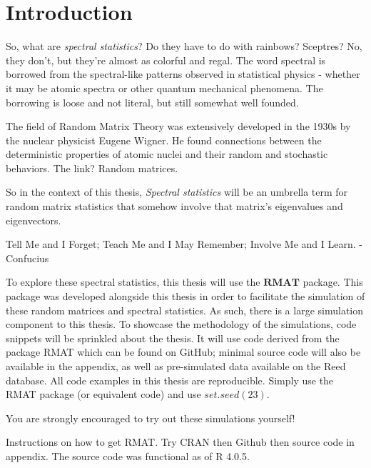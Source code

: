 
  \chapter*{Introduction}


So, what are \textit{spectral statistics}? Do they have to do with rainbows? Sceptres? No, they don’t, but they’re almost as colorful and regal. The word spectral is borrowed from the spectral-like patterns observed in statistical physics - whether it may be atomic spectra or other quantum mechanical phenomena. The borrowing is loose and not literal, but still somewhat well founded.

The field of Random Matrix Theory was extensively developed in the 1930s by the nuclear physicist Eugene Wigner. He found connections between the deterministic properties of atomic nuclei and their random and stochastic behaviors. The link? Random matrices.

So in the context of this thesis, \textit{Spectral statistics} will be an umbrella term for random matrix statistics that somehow involve that matrix's eigenvalues and eigenvectors.




\begin{displayquote}
Tell Me and I Forget; Teach Me and I May Remember; Involve Me and I Learn.
-Confucius
\end{displayquote}

To explore these spectral statistics, this thesis will use the $\textbf{RMAT}$ package. This package was developed alongside this thesis in order to facilitate the simulation of these random matrices and spectral statistics. As such, there is a large simulation component to this thesis. To showcase the methodology of the simulations, code snippets will be sprinkled about the thesis. It will use code derived from the package RMAT which can be found on GitHub; minimal source code will also be available in the appendix, as well as pre-simulated data available on the Reed database. All code examples in this thesis are reproducible. Simply use the RMAT package (or equivalent code) and use $set.seed(23)$.

You are strongly encouraged to try out these simulations yourself!

Instructions on how to get RMAT. Try CRAN then Github then source code in appendix. The source code was functional as of R 4.0.5.
